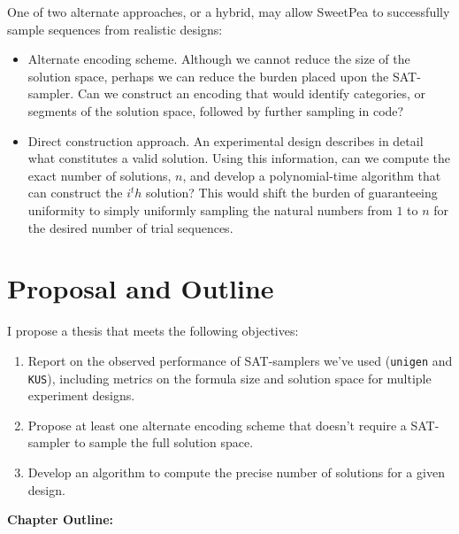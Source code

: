 \documentclass[a4paper]{article}
\begin{document}
One of two alternate approaches, or a hybrid, may allow SweetPea to successfully sample sequences from realistic designs:

\begin{itemize}
\item Alternate encoding scheme. Although we cannot reduce the size of the solution space, perhaps we can reduce the burden placed upon the SAT-sampler. Can we construct an encoding that would identify categories, or segments of the solution space, followed by further sampling in code?
\item Direct construction approach. An experimental design describes in detail what constitutes a valid solution. Using this information, can we compute the exact number of solutions, $n$, and develop a polynomial-time algorithm that can construct the $i^th$ solution? This would shift the burden of guaranteeing uniformity to simply uniformly sampling the natural numbers from $1$ to $n$ for the desired number of trial sequences.
\end{itemize}


\section*{Proposal and Outline}

I propose a thesis that meets the following objectives:

\begin{enumerate}
\item Report on the observed performance of SAT-samplers we've used (\texttt{unigen} and \texttt{KUS}), including metrics on the formula size and solution space for multiple experiment designs.
\item Propose at least one alternate encoding scheme that doesn't require a SAT-sampler to sample the full solution space.
\item Develop an algorithm to compute the precise number of solutions for a given design.
\end{enumerate}

\textbf{Chapter Outline:}
\end{document}
